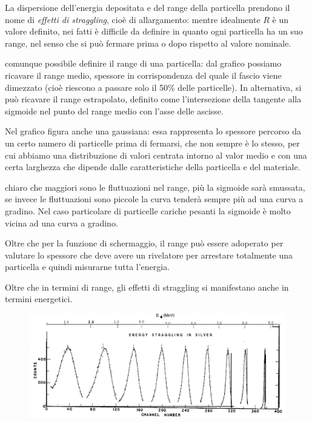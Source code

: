 \vspace{-0.4cm}

La dispersione dell'energia depositata e del range della particella prendono il nome di \textit{effetti di straggling}, cioè di allargamento: mentre idealmente $R$ è un valore definito, nei fatti è difficile da definire in quanto ogni particella ha un suo range, nel senso che si può fermare prima o dopo rispetto al valore nominale.

\E comunque possibile definire il range di una particella: dal grafico possiamo ricavare il range medio, spessore in corrispondenza del quale il fascio viene dimezzato (cioè riescono a passare solo il 50\% delle particelle). In alternativa, si può ricavare il range estrapolato, definito come l'intersezione della tangente alla sigmoide nel punto del range medio con l'asse delle ascisse.

Nel grafico figura anche una gaussiana: essa rappresenta lo spessore percorso da un certo numero di particelle prima di fermarsi, che non sempre è lo stesso, per cui abbiamo una distribuzione di valori centrata intorno al valor medio e con una certa larghezza che dipende dalle caratteristiche della particella e del materiale.

\E chiaro che maggiori sono le fluttuazioni nel range, più la sigmoide sarà smussata, se invece le fluttuazioni sono piccole la curva tenderà sempre più ad una curva a gradino. Nel caso particolare di particelle cariche pesanti la sigmoide è molto vicina ad una curva a gradino.

Oltre che per la funzione di schermaggio, il range può essere adoperato per valutare lo spessore che deve avere un rivelatore per arrestare totalmente una particella e quindi misurarne tutta l'energia.

Oltre che in termini di range, gli effetti di straggling si manifestano anche in termini energetici.

\begin{figure}[H]
    \centering
    \includegraphics[width=12cm]{immagini/straggling_energie.png}
\end{figure}

